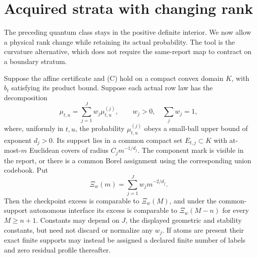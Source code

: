 \section{Acquired strata with changing rank}\label{sec:singular}
The preceding quantum class stays in the positive definite interior. We now allow a physical rank change while retaining its actual probability. The tool is the curvature alternative, which does not require the same-report map to contract on a boundary stratum.

\begin{proposition}\label{prop:strata}
Suppose the affine certificate and (C) hold on a compact convex domain $K$, with $b_t$ satisfying its product bound. Suppose each actual row law has the decomposition
\[
 \mu_{t,u}=\sum_{j=1}^J w_j\mu_{t,u}^{(j)},\qquad
 w_j>0,\quad\sum_jw_j=1,
\]
where, uniformly in $t,u$, the probability $\mu_{t,u}^{(j)}$ obeys a small-ball upper bound of exponent $d_j>0$. Its support lies in a common compact set $E_{t,j}\subset K$ with at-most-$m$ Euclidean covers of radius $C_jm^{-1/d_j}$. The component mark is visible in the report, or there is a common Borel assignment using the corresponding union codebook. Put
\begin{equation}\label{eq:profile}
 \Xi_w(m)=\sum_{j=1}^Jw_jm^{-2/d_j}.
\end{equation}
Then the checkpoint excess is comparable to $\Xi_w(M)$, and under the common-support autonomous interface its excess is comparable to $\Xi_w(M-n)$ for every $M\ge n+1$. Constants may depend on $J$, the displayed geometric and stability constants, but need not discard or normalize any $w_j$. If atoms are present their exact finite supports may instead be assigned a declared finite number of labels and zero residual profile thereafter.
\end{proposition}

